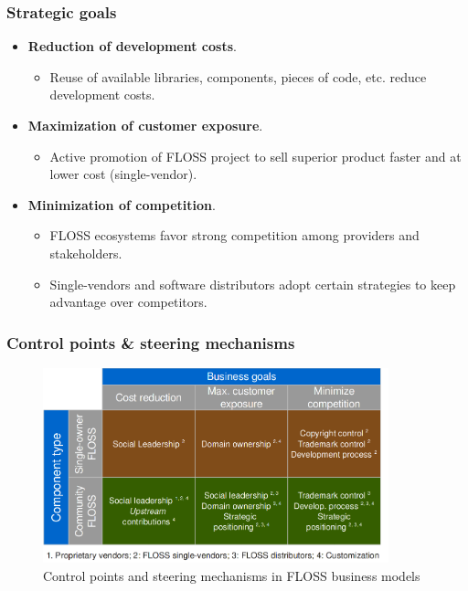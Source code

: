 \begin{frame}
 \frametitle{Strategic goals}
\begin{itemize}
 \item \textbf{Reduction of development costs}.
 \begin{itemize}
  \item Reuse of available libraries, components, pieces of code, etc. reduce development costs.
 \end{itemize}

 \item \textbf{Maximization of customer exposure}.
  \begin{itemize}
   \item Active promotion of FLOSS project to sell superior product faster and at lower cost (single-vendor).
  \end{itemize}

 \item \textbf{Minimization of competition}.
  \begin{itemize}
   \item FLOSS ecosystems favor strong competition among providers and stakeholders.
   \item Single-vendors and software distributors adopt certain strategies to keep advantage over competitors.
  \end{itemize}

\end{itemize}
\end{frame}


\begin{frame}
\frametitle{Control points \& steering mechanisms}

\begin{center}
  \begin{figure}
    \includegraphics[width=10cm]{figs/control-steering-mechanisms.png}
    \caption{Control points and steering mechanisms in FLOSS business models} 
  \end{figure}
\end{center}

\end{frame}

